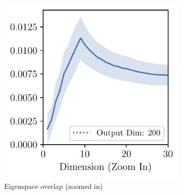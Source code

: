 \begin{figure}[H]
    \centering
    \begin{subfigure}[b]{0.24\textwidth}
        \centering
        \captionsetup{justification=centering}
        \includegraphics[width=\textwidth]{Appendix_Figures/Overlap_large_model/FailExplanation/FC2/DimOverlap_MNIST_FC2_fixlr0.01_fc2_zoom.pdf}
        \caption{Eigenspace overlap (zoomed in)}
        \label{fig:app_adexp_fc2_ovlp}
    \end{subfigure}%
    \begin{subfigure}[b]{0.24\textwidth}
        \centering
        \captionsetup{justification=centering}

\end{subfigure}
\end{figure}
